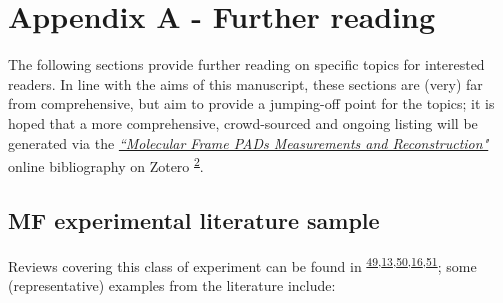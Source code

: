 \documentclass[10pt]{article}
\begin{document}

\section{Appendix A - Further reading\label{sec:Appendix-A}}

The following sections provide further reading on specific topics for interested readers. In line with the aims of this manuscript, these sections are (very) far from comprehensive, but aim to provide a jumping-off point for the topics; it is hoped that a more comprehensive, crowd-sourced and ongoing listing will be generated via the \href{https://www.zotero.org/groups/4733878/molecular_frame_pads_measurements_and_reconstruction}{\textit{``Molecular Frame PADs Measurements and Reconstruction"}} online bibliography on Zotero \textsuperscript{\hyperref[csl:2]{2}}.

\subsection{MF experimental literature sample\label{appendix:MF-expt}}

Reviews covering this class of experiment can be found in  \textsuperscript{\hyperref[csl:49]{49},\hyperref[csl:13]{13},\hyperref[csl:50]{50},\hyperref[csl:16]{16},\hyperref[csl:51]{51}}; some (representative) examples from the literature include:
\end{document}

